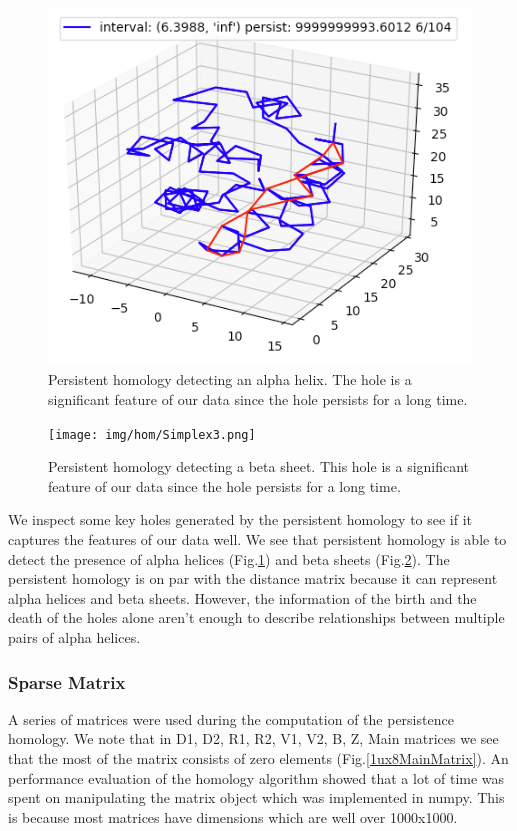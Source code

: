 \documentclass[12pt, a4paper, twocolumn, fullpage]{article}
\theoremstyle{plain}
\theoremstyle{definition}
\theoremstyle{remark}
\begin{document}
\begin{figure}[H]
    \includegraphics[width=\linewidth]{img/hom/Simplex2.png}
    \caption{Persistent homology detecting an alpha helix. The hole is a significant feature of our data since the hole persists for a long time.}
    \label{Simplex2}
\end{figure}

\begin{figure}[H]
    \texttt{[image: img/hom/Simplex3.png]}
    \caption{Persistent homology detecting a beta sheet. This hole is a significant feature of our data since the hole persists for a long time.}
    \label{Simplex3}
\end{figure}

We inspect some key holes generated by the persistent homology to see if it captures the  features of our data well. We see that persistent homology is able to detect the presence of alpha helices (Fig.\ref{Simplex2}) and beta sheets (Fig.\ref{Simplex3}). The persistent homology is on par with the distance matrix because it can represent alpha helices and beta sheets. However, the information of the birth and the death of the holes alone aren't enough to describe relationships between multiple pairs of alpha helices.

\subsubsection{ Sparse Matrix}

A series of matrices were used during the computation of the persistence homology. We note that in D1, D2, R1, R2, V1, V2, B, Z, Main matrices we see that the most of the matrix consists of zero elements (Fig.\ref{1ux8MainMatrix}). An performance evaluation of the homology algorithm showed that a lot of time was spent on manipulating the matrix object which was implemented in numpy. This is because most matrices have dimensions which are well over 1000x1000.
\end{document}
